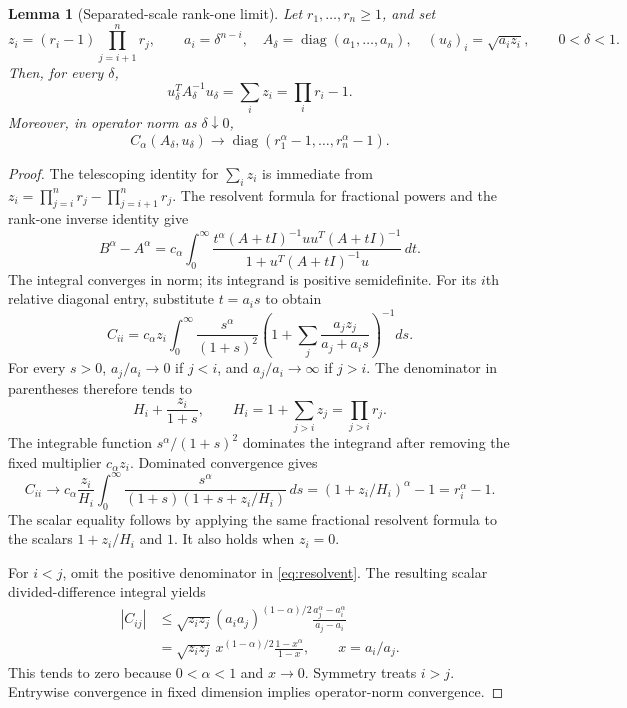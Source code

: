 \documentclass[11pt]{article}
\newtheorem{lemma}[theorem]{Lemma}
\newcommand{\diag}{\operatorname{diag}}
\begin{document}
\begin{lemma}[Separated-scale rank-one limit]\label{lem:scales}
Let $r_1,\ldots,r_n\ge1$, and set
\[
 z_i=(r_i-1)\prod_{j=i+1}^n r_j,\qquad
 a_i=\delta^{n-i},\quad
 A_\delta=\diag(a_1,\ldots,a_n),\quad
 (u_\delta)_i=\sqrt{a_i z_i},\qquad 0<\delta<1.
\]
Then, for every $\delta$,
\[
 u_\delta^TA_\delta^{-1}u_\delta
    =\sum_i z_i=\prod_i r_i-1.
\]
Moreover, in operator norm as $\delta\downarrow0$,
\[
 C_\alpha(A_\delta,u_\delta)
       \longrightarrow\diag(r_1^\alpha-1,\ldots,r_n^\alpha-1).
\]
\end{lemma}
\begin{proof}
The telescoping identity for $\sum_i z_i$ is immediate from
$z_i=\prod_{j=i}^n r_j-\prod_{j=i+1}^n r_j$.
The resolvent formula for fractional powers and the rank-one inverse
identity give
\begin{equation}\label{eq:resolvent}
 B^\alpha-A^\alpha
 =c_\alpha\int_0^\infty
 \frac{t^\alpha(A+tI)^{-1}uu^T(A+tI)^{-1}}
 {1+u^T(A+tI)^{-1}u}\,dt.
\end{equation}
The integral converges in norm; its integrand is positive semidefinite.
For its $i$th relative diagonal entry, substitute $t=a_i s$ to obtain
\begin{equation}\label{eq:diag}
 C_{ii}=c_\alpha z_i\int_0^\infty
 \frac{s^\alpha}{(1+s)^2}
 \left(1+\sum_j\frac{a_jz_j}{a_j+a_i s}\right)^{-1}ds.
\end{equation}
For every $s>0$, $a_j/a_i\to0$ if $j<i$, and $a_j/a_i\to\infty$
if $j>i$. The denominator in parentheses therefore tends to
\[
 H_i+\frac{z_i}{1+s},\qquad
 H_i=1+\sum_{j>i}z_j=\prod_{j>i}r_j.
\]
The integrable function $s^\alpha/(1+s)^2$ dominates the integrand
after removing the fixed multiplier $c_\alpha z_i$. Dominated
convergence gives
\[
 C_{ii}\longrightarrow
 c_\alpha\frac{z_i}{H_i}
    \int_0^\infty\frac{s^\alpha}{(1+s)(1+s+z_i/H_i)}\,ds
 = (1+z_i/H_i)^\alpha-1=r_i^\alpha-1.
\]
The scalar equality follows by applying the same fractional resolvent
formula to the scalars $1+z_i/H_i$ and $1$. It also holds when $z_i=0$.

For $i<j$, omit the positive denominator in \eqref{eq:resolvent}.
The resulting scalar divided-difference integral yields
\begin{align*}
 |C_{ij}|
 &\le\sqrt{z_i z_j}(a_i a_j)^{(1-\alpha)/2}
                  \frac{a_j^\alpha-a_i^\alpha}{a_j-a_i}\\
 &=\sqrt{z_i z_j}\,x^{(1-\alpha)/2}
                    \frac{1-x^\alpha}{1-x},\qquad x=a_i/a_j.
\end{align*}
This tends to zero because $0<\alpha<1$ and $x\to0$.
Symmetry treats $i>j$. Entrywise convergence in fixed dimension implies
operator-norm convergence.
\end{proof}
\end{document}
